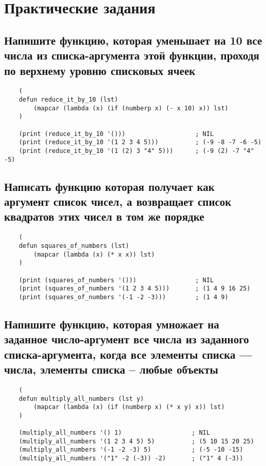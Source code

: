 \chapter{Практические задания}

\section{Напишите функцию, которая уменьшает на 10 все числа из списка-аргумента этой функции, проходя по верхнему уровню списковых ячеек}

\begin{lstlisting}
    (
    defun reduce_it_by_10 (lst)
        (mapcar (lambda (x) (if (numberp x) (- x 10) x)) lst)
    )

    (print (reduce_it_by_10 '()))                   ; NIL
    (print (reduce_it_by_10 '(1 2 3 4 5)))          ; (-9 -8 -7 -6 -5)
    (print (reduce_it_by_10 '(1 (2) 3 "4" 5)))      ; (-9 (2) -7 "4" -5)
\end{lstlisting}

\section{Написать функцию которая получает как аргумент список чисел, а возвращает список квадратов этих чисел в том же порядке}

\begin{lstlisting}
    (
    defun squares_of_numbers (lst)
        (mapcar (lambda (x) (* x x)) lst)
    )

    (print (squares_of_numbers '()))                ; NIL
    (print (squares_of_numbers '(1 2 3 4 5)))       ; (1 4 9 16 25) 
    (print (squares_of_numbers '(-1 -2 -3)))        ; (1 4 9)
\end{lstlisting}

\section{Напишите функцию, которая умножает на заданное число-аргумент все числа из заданного списка-аргумента, когда все элементы списка --- числа, элементы списка -- любые объекты}

\newpage

\begin{lstlisting}
    (
    defun multiply_all_numbers (lst y)
        (mapcar (lambda (x) (if (numberp x) (* x y) x)) lst)
    )
    
    (multiply_all_numbers '() 1)                   ; NIL
    (multiply_all_numbers '(1 2 3 4 5) 5)          ; (5 10 15 20 25)
    (multiply_all_numbers '(-1 -2 -3) 5)           ; (-5 -10 -15) 
    (multiply_all_numbers '("1" -2 (-3)) -2)       ; ("1" 4 (-3)) 
\end{lstlisting}

